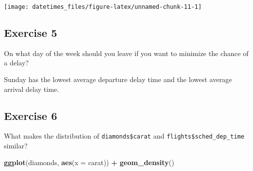 \documentclass[]{book}
\newenvironment{Shaded}{\begin{snugshade}}{\end{snugshade}}
\newcommand{\CommentTok}[1]{\textcolor[rgb]{0.56,0.35,0.01}{\textit{#1}}}
\newcommand{\DataTypeTok}[1]{\textcolor[rgb]{0.13,0.29,0.53}{#1}}
\newcommand{\KeywordTok}[1]{\textcolor[rgb]{0.13,0.29,0.53}{\textbf{#1}}}
\newcommand{\NormalTok}[1]{#1}
\newcommand{\OperatorTok}[1]{\textcolor[rgb]{0.81,0.36,0.00}{\textbf{#1}}}
\newcommand{\OtherTok}[1]{\textcolor[rgb]{0.56,0.35,0.01}{#1}}
\newcommand{\StringTok}[1]{\textcolor[rgb]{0.31,0.60,0.02}{#1}}
\theoremstyle{plain}
\theoremstyle{remark}
\theoremstyle{definition}
\theoremstyle{definition}
\theoremstyle{definition}
\theoremstyle{remark}
\begin{document}
\begin{center}\texttt{[image: datetimes\_files/figure-latex/unnamed-chunk-11-1]} \end{center}

\hypertarget{exercise-5-14}{%
\subsection{Exercise 5}\label{exercise-5-14}}

On what day of the week should you leave if you want to minimize the
chance of a delay?

Sunday has the lowest average departure delay time and the lowest
average arrival delay time.

\begin{Shaded}
\end{Shaded}

\hypertarget{exercise-6-10}{%
\subsection{Exercise 6}\label{exercise-6-10}}

What makes the distribution of \texttt{diamonds\$carat} and
\texttt{flights\$sched\_dep\_time} similar?

\begin{Shaded}
\begin{Highlighting}[]
\KeywordTok{ggplot}\NormalTok{(diamonds, }\KeywordTok{aes}\NormalTok{(}\DataTypeTok{x =}\NormalTok{ carat)) }\OperatorTok{+}
\StringTok{  }\KeywordTok{geom_density}\NormalTok{()}
\end{Highlighting}
\end{Shaded}
\end{document}
